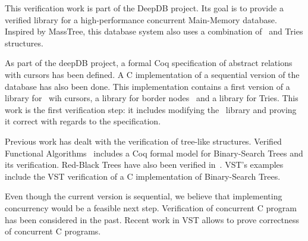 This verification work is part of the DeepDB project.
Its goal is to provide a verified library for a high-performance concurrent Main-Memory database.
Inspired by MassTree, this database system also uses a combination of \btrees\ and Tries structures.

As part of the deepDB project, a formal Coq specification of abstract relations with cursors has been defined.
A C implementation of a sequential version of the database has also been done.
This implementation contains a first version of a library for \btrees\ wih cursors, a library for border nodes~\cite{masstree} and a library for Tries.
This work is the first verification step: it includes modifying the \btrees\ library and proving it correct with regards to the specification.

Previous work has dealt with the verification of tree-like structures.
Verified Functional Algorithms~\cite{vfa} includes a Coq formal model for Binary-Search Trees and its verification.
Red-Black Trees have also been verified in~\cite{redblack}.
VST's examples~\cite{vst} include the VST verification of a C implementation of Binary-Search Trees.

Even though the current version is sequential, we believe that implementing concurrency would be a feasible next step.
Verification of concurrent C program has been considered in the past.
Recent work in VST allows to prove correctness of concurrent C programs.


